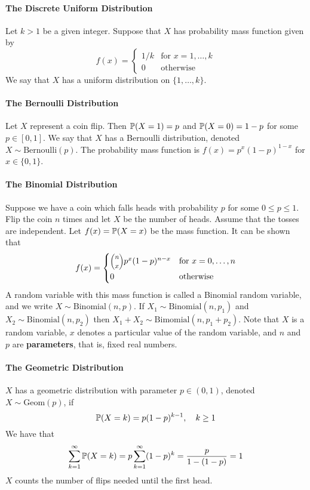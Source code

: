 \paragraph{The Discrete Uniform Distribution}\label{the-discrete-uniform-distribution}
Let \(k > 1\) be a given integer. Suppose that \(X\) has probability mass function given by
\[
f(x) = 
\begin{cases}
1/k &\text{for } x = 1, \dots, k 
\\[
1ex]
0 &\text{otherwise}
\end{cases}
\]
We say that \(X\) has a uniform distribution on \(\{ 1, \dots, k \}\).
\paragraph{The Bernoulli Distribution}\label{the-bernoulli-distribution}
Let \(X\) represent a coin flip. Then \(\operatorname{\mathbb{P}}(X = 1) = p\) and \(\operatorname{\mathbb{P}}(X = 0) = 1 - p\) for some \(p \in [0, 1]\). We say that \(X\) has a Bernoulli distribution, denoted \(X \sim \text{Bernoulli}(p)\). The probability mass function is \(f(x) = p^x (1 - p)^{1 - x}\) for \(x \in \{ 0, 1 \}\).
\paragraph{The Binomial Distribution}\label{the-binomial-distribution}
Suppose we have a coin which falls heads with probability \(p\) for some \(0 \leq p \leq 1\). Flip the coin \(n\) times and let \(X\) be the number of heads. Assume that the tosses are independent. Let \(f(x) = \operatorname{\mathbb{P}}(X = x)\) be the mass function. It can be shown that
\[
f(x) = 
\begin{cases}
\binomial{n}{x} p^x (1 - p)^{n - x} &\text{for } x= 0, \dots, n 
\\[
1ex]
0 &\text{otherwise}
\end{cases}
\]
A random variable with this mass function is called a Binomial random variable, and we write \(X \sim \text{Binomial}(n, p)\). If \(X_{1} \sim \text{Binomial}(n, p_{1})\) and \(X_{2} \sim \text{Binomial}(n, p_{2})\) then \(X_{1} + X_{2} \sim \text{Bimomial}(n, p_{1} + p_{2})\).
Note that \(X\) is a random variable, \(x\) denotes a particular value of the random variable, and \(n\) and \(p\) are \textbf{parameters}, that is, fixed real numbers.
\paragraph{The Geometric Distribution}\label{the-geometric-distribution}
\(X\) has a geometric distribution with parameter \(p \in (0, 1)\), denoted \(X \sim \text{Geom}(p)\), if
\[
\operatorname{\mathbb{P}}(X = k) = p(1 - p)^{k - 1}, \quad k \geq 1
\]
We have that
\[
\sum_{k=1}^{\infty} \operatorname{\mathbb{P}}(X = k) = p \sum_{k=1}^{\infty} (1 - p)^{k} = \frac{p}{1 - (1 - p)} = 1
\]
\(X\) counts the number of flips needed until the first head.
